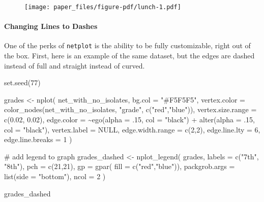 \documentclass[
]{apa7}
\let\oldparagraph\paragraph
\renewcommand{\paragraph}[1]{\oldparagraph{#1}\mbox{}}
\newenvironment{Shaded}{\begin{snugshade}}{\end{snugshade}}
\newcommand{\AttributeTok}[1]{\textcolor[rgb]{0.40,0.45,0.13}{#1}}
\newcommand{\CommentTok}[1]{\textcolor[rgb]{0.37,0.37,0.37}{#1}}
\newcommand{\ConstantTok}[1]{\textcolor[rgb]{0.56,0.35,0.01}{#1}}
\newcommand{\DecValTok}[1]{\textcolor[rgb]{0.68,0.00,0.00}{#1}}
\newcommand{\FloatTok}[1]{\textcolor[rgb]{0.68,0.00,0.00}{#1}}
\newcommand{\FunctionTok}[1]{\textcolor[rgb]{0.28,0.35,0.67}{#1}}
\newcommand{\NormalTok}[1]{\textcolor[rgb]{0.00,0.23,0.31}{#1}}
\newcommand{\OtherTok}[1]{\textcolor[rgb]{0.00,0.23,0.31}{#1}}
\newcommand{\SpecialCharTok}[1]{\textcolor[rgb]{0.37,0.37,0.37}{#1}}
\newcommand{\StringTok}[1]{\textcolor[rgb]{0.13,0.47,0.30}{#1}}
\begin{document}
\begin{figure}[H]

{\centering \texttt{[image: paper\_files/figure-pdf/lunch-1.pdf]}

}

\end{figure}

\hypertarget{changing-lines-to-dashes}{%
\paragraph{Changing Lines to Dashes}\label{changing-lines-to-dashes}}

One of the perks of \texttt{netplot} is the ability to be fully
customizable, right out of the box. First, here is an example of the
same dataset, but the edges are dashed instead of full and straight
instead of curved.

\begin{Shaded}
\begin{Highlighting}[]
\FunctionTok{set.seed}\NormalTok{(}\DecValTok{77}\NormalTok{)}

\NormalTok{grades }\OtherTok{\textless{}{-}} \FunctionTok{nplot}\NormalTok{(}
\NormalTok{  net\_with\_no\_isolates,}
  \AttributeTok{bg.col =} \StringTok{"\#F5F5F5"}\NormalTok{,}
  \AttributeTok{vertex.color =} \FunctionTok{color\_nodes}\NormalTok{(net\_with\_no\_isolates, }\StringTok{"grade"}\NormalTok{, }\FunctionTok{c}\NormalTok{(}\StringTok{"red"}\NormalTok{,}\StringTok{"blue"}\NormalTok{)),}
  \AttributeTok{vertex.size.range =} \FunctionTok{c}\NormalTok{(}\FloatTok{0.02}\NormalTok{, }\FloatTok{0.02}\NormalTok{),}
  \AttributeTok{edge.color =} \SpecialCharTok{\textasciitilde{}}\FunctionTok{ego}\NormalTok{(}\AttributeTok{alpha =}\NormalTok{ .}\DecValTok{15}\NormalTok{, }\AttributeTok{col =} \StringTok{"black"}\NormalTok{) }\SpecialCharTok{+} \FunctionTok{alter}\NormalTok{(}\AttributeTok{alpha =}\NormalTok{ .}\DecValTok{15}\NormalTok{, }\AttributeTok{col =} \StringTok{"black"}\NormalTok{),}
  \AttributeTok{vertex.label =} \ConstantTok{NULL}\NormalTok{,}
  \AttributeTok{edge.width.range =} \FunctionTok{c}\NormalTok{(}\DecValTok{2}\NormalTok{,}\DecValTok{2}\NormalTok{),}
  \AttributeTok{edge.line.lty =} \DecValTok{6}\NormalTok{,}
  \AttributeTok{edge.line.breaks =} \DecValTok{1}  
\NormalTok{)  }



\CommentTok{\# add legend to graph}
\NormalTok{grades\_dashed }\OtherTok{\textless{}{-}} \FunctionTok{nplot\_legend}\NormalTok{(}
\NormalTok{  grades,}
  \AttributeTok{labels =} \FunctionTok{c}\NormalTok{(}\StringTok{"7th"}\NormalTok{, }\StringTok{"8th"}\NormalTok{),}
  \AttributeTok{pch =} \FunctionTok{c}\NormalTok{(}\DecValTok{21}\NormalTok{,}\DecValTok{21}\NormalTok{),}
  \AttributeTok{gp =} \FunctionTok{gpar}\NormalTok{(}
    \AttributeTok{fill =} \FunctionTok{c}\NormalTok{(}\StringTok{"red"}\NormalTok{,}\StringTok{"blue"}\NormalTok{)),}
  \AttributeTok{packgrob.args =} \FunctionTok{list}\NormalTok{(}\AttributeTok{side =} \StringTok{"bottom"}\NormalTok{),}
  \AttributeTok{ncol =} \DecValTok{2}  
\NormalTok{)}

\NormalTok{grades\_dashed}
\end{Highlighting}
\end{Shaded}
\end{document}

